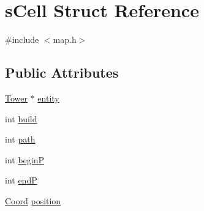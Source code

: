 \hypertarget{structs_cell}{\section{s\-Cell Struct Reference}
\label{structs_cell}
}


{\ttfamily \#include $<$map.\-h$>$}

\subsection*{Public Attributes}
\begin{DoxyCompactItemize}
\item 
\hyperlink{tower_8h_a5070e945849fb8f0b9f8e9049b7434ba}{Tower} $\ast$ \hyperlink{structs_cell_a9304c71735ad125198fc7bb3070e7bc4}{entity}
\item 
int \hyperlink{structs_cell_a97b34abb3010bf4ec10aa5f7c6400cef}{build}
\item 
int \hyperlink{structs_cell_a03358119a2ac874f7d85b94d7b651a6c}{path}
\item 
int \hyperlink{structs_cell_a40488db19acb0a9d5ff33882a46a1303}{begin\-P}
\item 
int \hyperlink{structs_cell_a6ec923340fb62915663be3fb0015f3cd}{end\-P}
\item 
\hyperlink{coordonates_8h_aff9d4468ac7a973ce7e5cfb5bd39bc33}{Coord} \hyperlink{structs_cell_a7b1e23f03b64816ca088b2f63082975b}{position}
\end{DoxyCompactItemize}


